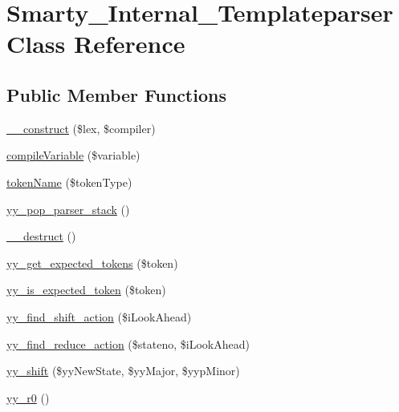 \hypertarget{class_smarty___internal___templateparser}{}\section{Smarty\+\_\+\+Internal\+\_\+\+Templateparser Class Reference}
\label{class_smarty___internal___templateparser}
\subsection*{Public Member Functions}
\begin{DoxyCompactItemize}
\item 
\hyperlink{class_smarty___internal___templateparser_a88f21d9c2bfefae24140906c124699cd}{\+\_\+\+\_\+construct} (\$lex, \$compiler)
\item 
\hyperlink{class_smarty___internal___templateparser_a788aca72b084551b37dab8920658b84f}{compile\+Variable} (\$variable)
\item 
\hyperlink{class_smarty___internal___templateparser_a352279cd57963ae851bc753d0a594f20}{token\+Name} (\$token\+Type)
\item 
\hyperlink{class_smarty___internal___templateparser_a77f6b72a07ed6c56a12e2411223d1862}{yy\+\_\+pop\+\_\+parser\+\_\+stack} ()
\item 
\hyperlink{class_smarty___internal___templateparser_a421831a265621325e1fdd19aace0c758}{\+\_\+\+\_\+destruct} ()
\item 
\hyperlink{class_smarty___internal___templateparser_a6c0edb6b86d23ca54f81ccfd4c1831b2}{yy\+\_\+get\+\_\+expected\+\_\+tokens} (\$token)
\item 
\hyperlink{class_smarty___internal___templateparser_addf1cba9aaadf9ca1e265cdd8e19b07c}{yy\+\_\+is\+\_\+expected\+\_\+token} (\$token)
\item 
\hyperlink{class_smarty___internal___templateparser_a05ab831440011fdfe6a6505c0dc34b66}{yy\+\_\+find\+\_\+shift\+\_\+action} (\$i\+Look\+Ahead)
\item 
\hyperlink{class_smarty___internal___templateparser_a3eaa296803983069c6c2c02dca2163b4}{yy\+\_\+find\+\_\+reduce\+\_\+action} (\$stateno, \$i\+Look\+Ahead)
\item 
\hyperlink{class_smarty___internal___templateparser_ab7616daa9339158155f953ed7ea51e17}{yy\+\_\+shift} (\$yy\+New\+State, \$yy\+Major, \$yyp\+Minor)
\item 
\hyperlink{class_smarty___internal___templateparser_a54c88e2da90a6e41f0115dd8d6809bf2}{yy\+\_\+r0} ()

\end{DoxyCompactItemize}
